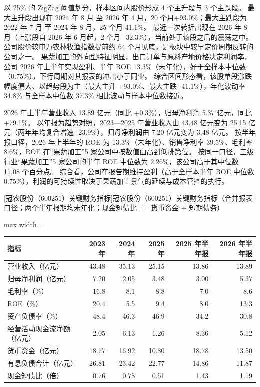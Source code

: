  以 25\% 的 ZigZag 阈值划分，样本区间内股价形成 4 个主升段与 3 个主跌段。 最大主升段出现在 2024 年 8 月 至 2026 年 4 月，20 个月+93.0\%；最大主跌段为 2022 年 7 月 至 2024 年 8 月，25 个月-41.1\%。 最近一次转折出现在 2026 年 8 月（上涨段自 2026 年 6 月起，2 个月+32.3\%），当前处于该段之后的震荡之中。 公司股价较申万农林牧渔指数提前约 64 个月见底，是板块中较早定价周期反转的公司之一。 果蔬加工的外向型特征明显，出口订单与原料产地价格决定利润率，公司 2026 年上半年实现盈利、半年 ROE 13.3\%（未年化），好于全样本中位数（0.75\%），下行周期对其报表的冲击小于同业。 综合区间形态看，该股单段涨跌幅度偏大、以趋势段为主（最大主升 +93.0\%、最大主跌 -41.1\%），年化波动率 34.8\% 与全样本中位数 37.3\% 相比波动与样本中位数接近。

 2026 年上半年营业收入 13.89 亿元（同比 +0.3\%），归母净利润 5.37 亿元，同比 +79.1\%。 以年报为趋势对照，2023---2025 年营业收入由 43.48 亿元变为 25.15 亿元（两年年均复合增速 -23.9\%），归母净利润由 7.20 亿元变为 3.48 亿元。 按半年报口径，2026 年上半年的 ROE 为 13.3\%（未年化）、销售净利率 39.5\%、毛利率 8.6\%，ROE 在“果蔬加工”5 家公司中按数值由高到低排第位。 按同一口径，三级行业“果蔬加工”5 家公司的半年 ROE 中位数为 2.26\%，该公司高于其中位数 11.08 个百分点。 综合看，公司在报告期维持盈利（高于全样本半年 ROE 中位数 0.75\%），利润的可持续性取决于果蔬加工景气的延续与成本管控的执行。

\begin{center}\small\setlength{\tabcolsep}{3.4pt}
[冠农股份（600251）关键财务指标]{冠农股份（600251）关键财务指标（合并报表口径；两个半年报期均未年化；现金短债比 $=$ 货币资金 $\div$ 短期债务）}
\begin{adjustbox}{max width=\textwidth}
\begin{tabular}{@{}lrrrrr@{}}
\toprule
指标 & 2023 年 & 2024 年 & 2025 年 & 2025 年半年报 & 2026 年半年报 \\
\midrule
营业收入（亿元） & 43.48 & 35.13 & 25.15 & 13.86 & 13.89 \\
归母净利润（亿元） & 7.20 & 2.05 & 3.48 & 3.00 & 5.37 \\
毛利率（\%） & 16.8 & 8.1 & 8.8 & 7.0 & 8.6 \\
ROE（\%） & 20.4 & 5.5 & 9.4 & 8.0 & 13.3 \\
资产负债率（\%） & 48.4 & 46.3 & 46.9 & 34.2 & 30.8 \\
经营活动现金流净额（亿元） & 2.05 & 6.13 & 1.26 & 8.36 & 5.12 \\
货币资金（亿元） & 18.77 & 16.92 & 10.80 & 18.78 & 13.50 \\
有息负债合计（亿元） & 26.81 & 23.42 & 22.77 & 14.86 & 11.87 \\
现金短债比（倍） & 0.76 & 0.78 & 0.51 & 1.43 & 1.19 \\
\bottomrule
\end{tabular}
\end{adjustbox}
\end{center}

